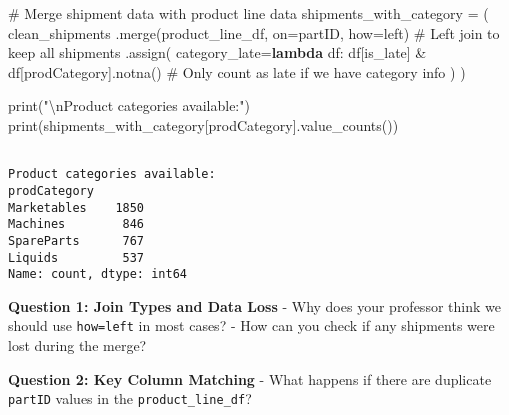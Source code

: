 \documentclass[
  letterpaper,
  DIV=11,
  numbers=noendperiod]{scrartcl}
\newenvironment{Shaded}{\begin{snugshade}}{\end{snugshade}}
\newcommand{\BuiltInTok}[1]{\textcolor[rgb]{0.00,0.23,0.31}{#1}}
\newcommand{\CharTok}[1]{\textcolor[rgb]{0.13,0.47,0.30}{#1}}
\newcommand{\CommentTok}[1]{\textcolor[rgb]{0.37,0.37,0.37}{#1}}
\newcommand{\KeywordTok}[1]{\textcolor[rgb]{0.00,0.23,0.31}{\textbf{#1}}}
\newcommand{\NormalTok}[1]{\textcolor[rgb]{0.00,0.23,0.31}{#1}}
\newcommand{\OperatorTok}[1]{\textcolor[rgb]{0.37,0.37,0.37}{#1}}
\newcommand{\StringTok}[1]{\textcolor[rgb]{0.13,0.47,0.30}{#1}}
\begin{document}
\label{mental-model-6-merge-prep}
\begin{Shaded}
\begin{Highlighting}[]
\CommentTok{\# Merge shipment data with product line data}
\NormalTok{shipments\_with\_category }\OperatorTok{=}\NormalTok{ (}
\NormalTok{    clean\_shipments}
\NormalTok{    .merge(product\_line\_df, on}\OperatorTok{=}\StringTok{\textquotesingle{}partID\textquotesingle{}}\NormalTok{, how}\OperatorTok{=}\StringTok{\textquotesingle{}left\textquotesingle{}}\NormalTok{)  }\CommentTok{\# Left join to keep all shipments}
\NormalTok{    .assign(}
\NormalTok{        category\_late}\OperatorTok{=}\KeywordTok{lambda}\NormalTok{ df: df[}\StringTok{\textquotesingle{}is\_late\textquotesingle{}}\NormalTok{] }\OperatorTok{\&}\NormalTok{ df[}\StringTok{\textquotesingle{}prodCategory\textquotesingle{}}\NormalTok{].notna()  }\CommentTok{\# Only count as late if we have category info}
\NormalTok{    )}
\NormalTok{)}

\BuiltInTok{print}\NormalTok{(}\StringTok{"}\CharTok{\textbackslash{}n}\StringTok{Product categories available:"}\NormalTok{)}
\BuiltInTok{print}\NormalTok{(shipments\_with\_category[}\StringTok{\textquotesingle{}prodCategory\textquotesingle{}}\NormalTok{].value\_counts())}
\end{Highlighting}
\end{Shaded}

\begin{verbatim}

Product categories available:
prodCategory
Marketables    1850
Machines        846
SpareParts      767
Liquids         537
Name: count, dtype: int64
\end{verbatim}

\begin{tcolorbox}[enhanced jigsaw, colbacktitle=quarto-callout-important-color!10!white, opacitybacktitle=0.6, colframe=quarto-callout-important-color-frame, coltitle=black, left=2mm, titlerule=0mm, title=\textcolor{quarto-callout-important-color}{\faExclamation}\hspace{0.5em}{🤔 Discussion Questions: Merge Mental Model}, bottomtitle=1mm, opacityback=0, arc=.35mm, rightrule=.15mm, colback=white, breakable, bottomrule=.15mm, toprule=.15mm, toptitle=1mm, leftrule=.75mm]

\textbf{Question 1: Join Types and Data Loss} - Why does your professor
think we should use
\texttt{how=\textquotesingle{}left\textquotesingle{}} in most cases? -
How can you check if any shipments were lost during the merge?

\textbf{Question 2: Key Column Matching} - What happens if there are
duplicate \texttt{partID} values in the \texttt{product\_line\_df}?

\end{tcolorbox}
\end{document}
